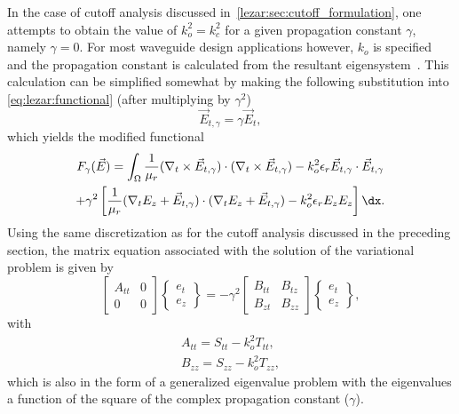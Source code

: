 In the case of cutoff analysis discussed
in~\ref{lezar:sec:cutoff_formulation}, one attempts to obtain the
value of $k_o^2 = k_c^2$ for a given propagation constant $\gamma$,
namely $\gamma = 0$.  For most waveguide design applications however,
$k_o$ is specified and the propagation constant is calculated from the
resultant eigensystem~\citep{Jin2002, PelosiCoccioliSelleri1998}. This
calculation can be simplified somewhat by making the following
substitution into \eqref{eq:lezar:functional} (after multiplying by
$\gamma^2$)
\begin{equation}
    \vec{E}_{t,\gamma} = \gamma\vec{E}_t,
\end{equation}
which yields the modified functional
\begin{multline}
    \label{eq:lezar:functional_scaled}
    F_\gamma(\vec{E}) =
    \int_{\Omega}\frac{1}{\mu_r}(\nabla_t\times{\vec{E}_{t,\gamma}})\cdot(\nabla_t\times{\vec{E}_{t,\gamma}}) -k_o^2\epsilon_r\vec{E}_{t,\gamma}\cdot{\vec{E}_{t,\gamma}}\\
    +\gamma^2\left[\frac{1}{\mu_r}(\nabla_t{E_z} +
    \vec{E}_{t,\gamma})\cdot(\nabla_t{E_z} + \vec{E}_{t,\gamma})-k_o^2\epsilon_r
    E_z{E_z}\right] \dx.
\end{multline}
Using the same discretization as for the cutoff analysis discussed in the preceding section, the matrix equation associated with the solution of the variational problem is given by~\citep{PelosiCoccioliSelleri1998}
\begin{equation}
    \label{eq:lezar:matrix_equation_dispersion}
    \begin{bmatrix} A_{tt} & 0\\0 & 0\end{bmatrix}\begin{Bmatrix}e_t\\e_z\end{Bmatrix} =
    -\gamma^2\begin{bmatrix} B_{tt} & B_{tz}\\B_{zt} &
    B_{zz}\end{bmatrix}\begin{Bmatrix}e_t\\e_z\end{Bmatrix},
\end{equation}
with
\begin{align}
    \label{eq:lezar:A_tt}
    A_{tt} = S_{tt} - k_o^2 T_{tt},\\
    \label{eq:lezar:B_zz}
    B_{zz} = S_{zz} - k_o^2 T_{zz},
\end{align}
which is also in the form of a generalized eigenvalue
problem with the eigenvalues a function of
the square of the complex propagation constant ($\gamma$).

